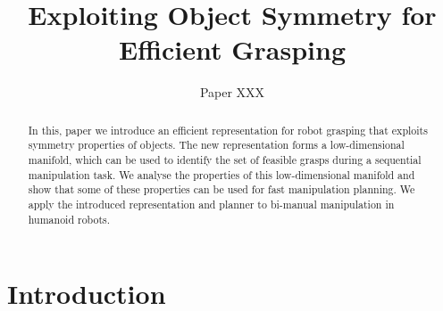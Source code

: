 \documentclass{aamas2015}
\begin{document}
\title{Exploiting Object Symmetry for Efficient Grasping}

\author{
\alignauthor
Paper XXX
}

\newcommand{\vech}[1]{\textbf{#1}}
\newcommand{\set}[1]{\textbf{#1}}

\maketitle



\begin{abstract}
In this, paper we introduce an efficient representation for robot grasping that exploits symmetry
properties of objects. The new representation forms a low-dimensional manifold, which can be used to
identify the set of feasible grasps during a sequential manipulation task. We analyse the properties
of this low-dimensional manifold and show that some of these properties can be used for fast
manipulation planning. We apply the introduced representation and planner to bi-manual manipulation
in humanoid robots.
\end{abstract}


\section{Introduction}
\end{document}
